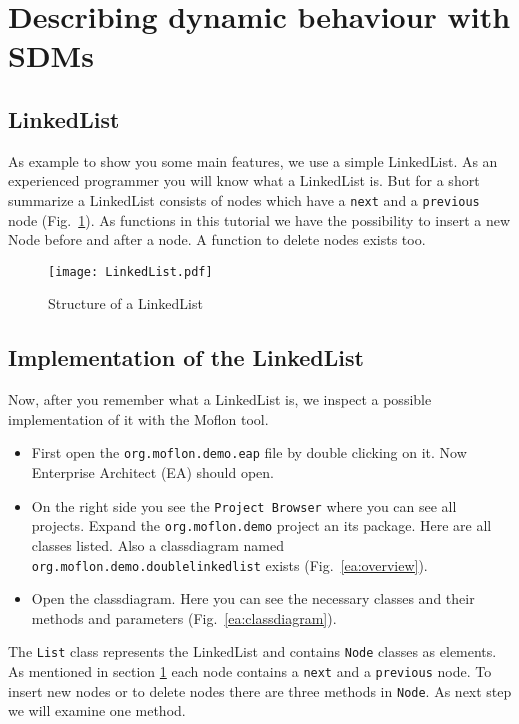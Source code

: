 \section{Describing dynamic behaviour with SDMs}
\subsection{LinkedList}
\label{sec:LinkedList}
As example to show you some main features, we use a simple LinkedList. As an experienced programmer you will know what a LinkedList is. But for a short summarize a LinkedList consists of nodes which have a \texttt{next} and a \texttt{previous} node (Fig.~\ref{linkedList}). As functions in this tutorial we have the possibility to insert a new Node before and after a node. A function to delete nodes exists too.

\begin{figure}[htbp]
	\centering
  \texttt{[image: LinkedList.pdf]}
	\caption{Structure of a LinkedList} 
	\label{linkedList} 
\end{figure}

\subsection{Implementation of the LinkedList}
Now, after you remember what a LinkedList is, we inspect a possible implementation of it with the Moflon tool.

\begin{itemize}
\item First open the \texttt{org.moflon.demo.eap} file by double clicking on it. Now Enterprise Architect (EA) should open.

\item On the right side you see the \texttt{Project Browser} where you can see all projects. Expand the \texttt{org.moflon.demo} project an its package. Here are all classes listed. Also a classdiagram named \texttt{org.\-moflon.\-demo.\-double\-linked\-list} exists (Fig.~\ref{ea:overview}).


\item Open the classdiagram. Here you can see the necessary classes and their methods and parameters (Fig.~\ref{ea:classdiagram}).
\end{itemize}

The \texttt{List} class represents the LinkedList and contains \texttt{Node} classes as elements. As mentioned in section \ref{linkedList} each node contains a \texttt{next} and a \texttt{previous} node. To insert new nodes or to delete nodes there are three methods in \texttt{Node}.
\newline
As next step we will examine one method.

